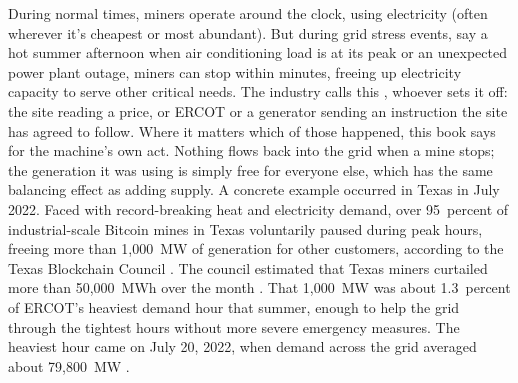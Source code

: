 During normal times, miners operate around the clock, using electricity (often wherever it's cheapest or most abundant). But during grid stress events, say a hot summer afternoon when air conditioning load is at its peak or an unexpected power plant outage, miners can stop within minutes, freeing up electricity capacity to serve other critical needs. The industry calls this , whoever sets it off: the site reading a price, or ERCOT or a generator sending an instruction the site has agreed to follow. Where it matters which of those happened, this book says  for the machine's own act. Nothing flows back into the grid when a mine stops; the generation it was using is simply free for everyone else, which has the same balancing effect as adding supply. A concrete example occurred in Texas in July 2022. Faced with record-breaking heat and electricity demand, over 95~percent of industrial-scale Bitcoin mines in Texas voluntarily paused during peak hours, freeing more than 1,000~MW of generation for other customers, according to the Texas Blockchain Council \autocite{TexasTribuneCrypto2022}. %
The council estimated that Texas miners curtailed more than 50,000~MWh over the month \autocite{UtilityDiveBitcoin2022}. %
That 1,000~MW was about 1.3~percent of ERCOT's heaviest demand hour that summer, enough to help the grid through the tightest hours without more severe emergency measures. The heaviest hour came on July 20, 2022, when demand across the grid averaged about 79,800~MW \autocite{EIAErcotPeak2023}. %

